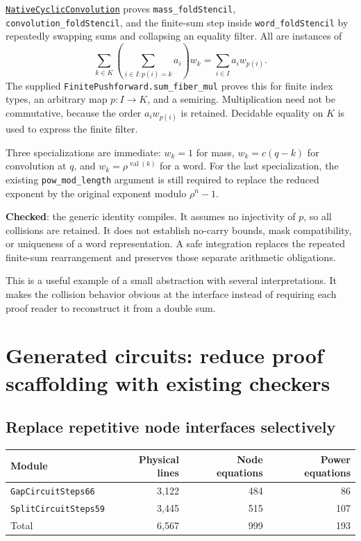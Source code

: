\documentclass[11pt,letterpaper]{article}
\newcommand{\code}[1]{\nolinkurl{#1}}
\newcommand{\src}[1]{\href{https://github.com/VladimirReshetnikov/ProveIt/blob/60e9c5d620c6c387d932876cfa2d9376f64ea56c/Computability/DiophantineConsistency/Lean/DiophantineConsistency/#1.lean}{\texttt{#1}}}
\newcommand{\checked}{\textbf{Checked}}
\begin{document}
\src{NativeCyclicConvolution} proves \code{mass_foldStencil},
\code{convolution_foldStencil}, and the finite-sum step inside
\code{word_foldStencil} by repeatedly swapping sums and collapsing an equality
filter. All are instances of
\begin{equation}\label{eq:pushforward}
 \sum_{k\in K}\left(\sum_{i\in I:p(i)=k}a_i\right)w_k
 =\sum_{i\in I}a_iw_{p(i)}.
\end{equation}
The supplied \code{FinitePushforward.sum_fiber_mul} proves this for finite
index types, an arbitrary map $p:I\to K$, and a semiring. Multiplication need
not be commutative, because the order $a_iw_{p(i)}$ is retained. Decidable
equality on $K$ is used to express the finite filter.

Three specializations are immediate: $w_k=1$ for mass,
$w_k=c(q-k)$ for convolution at $q$, and $w_k=\rho^{\operatorname{val}(k)}$
for a word. For the last specialization, the existing
\code{pow_mod_length} argument is still required to replace the reduced
exponent by the original exponent modulo $\rho^n-1$.

\checked: the generic identity compiles. It assumes no injectivity of $p$,
so all collisions are retained. It does not establish no-carry bounds, mask
compatibility, or uniqueness of a word representation. A safe integration
replaces the repeated finite-sum rearrangement and preserves those separate
arithmetic obligations.

This is a useful example of a small abstraction with several interpretations.
It makes the collision behavior obvious at the interface instead of requiring
each proof reader to reconstruct it from a double sum.

\section{Generated circuits: reduce proof scaffolding with existing checkers}

\subsection{Replace repetitive node interfaces selectively}

\begin{center}
\begin{tabular}{lrrr}
\toprule
Module & Physical lines & Node equations & Power equations\\
\midrule
\code{GapCircuitSteps66} & 3,122 & 484 & 86\\
\code{SplitCircuitSteps59} & 3,445 & 515 & 107\\
\midrule
Total & 6,567 & 999 & 193\\
\bottomrule
\end{tabular}
\end{center}
\end{document}
